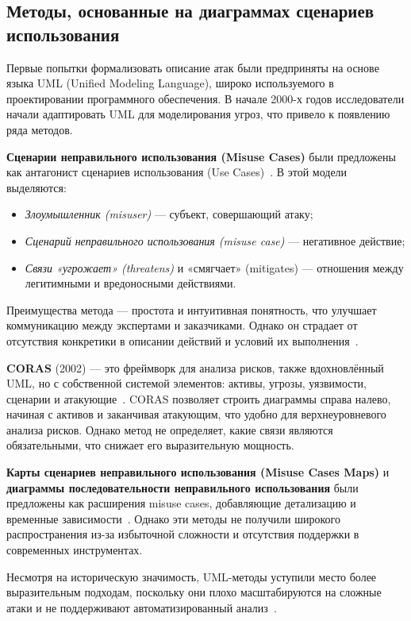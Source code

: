 \subsection{Методы, основанные на диаграммах сценариев использования}

Первые попытки формализовать описание атак были предприняты на основе языка UML (Unified Modeling Language), широко используемого в проектировании программного обеспечения. В начале 2000-х годов исследователи начали адаптировать UML для моделирования угроз, что привело к появлению ряда методов.

\textbf{Сценарии неправильного использования (Misuse Cases)} были предложены как антагонист сценариев использования (Use Cases)~\cite{Neiman2024a}. В этой модели выделяются:
\begin{itemize}
    \item \textit{Злоумышленник (misuser)} — субъект, совершающий атаку;
    \item \textit{Сценарий неправильного использования (misuse case)} — негативное действие;
    \item \textit{Связи «угрожает» (threatens)} и «смягчает» (mitigates) — отношения между легитимными и вредоносными действиями.
\end{itemize}
Преимущества метода — простота и интуитивная понятность, что улучшает коммуникацию между экспертами и заказчиками. Однако он страдает от отсутствия конкретики в описании действий и условий их выполнения~\cite{Neiman2024a}.

\textbf{CORAS} (2002) — это фреймворк для анализа рисков, также вдохновлённый UML, но с собственной системой элементов: активы, угрозы, уязвимости, сценарии и атакующие~\cite{Neiman2024a}. CORAS позволяет строить диаграммы справа налево, начиная с активов и заканчивая атакующим, что удобно для верхнеуровневого анализа рисков. Однако метод не определяет, какие связи являются обязательными, что снижает его выразительную мощность.

\textbf{Карты сценариев неправильного использования (Misuse Cases Maps)} и \textbf{диаграммы последовательности неправильного использования} были предложены как расширения misuse cases, добавляющие детализацию и временные зависимости~\cite{Neiman2024a}. Однако эти методы не получили широкого распространения из-за избыточной сложности и отсутствия поддержки в современных инструментах.

Несмотря на историческую значимость, UML-методы уступили место более выразительным подходам, поскольку они плохо масштабируются на сложные атаки и не поддерживают автоматизированный анализ~\cite{Lallie2019}.

